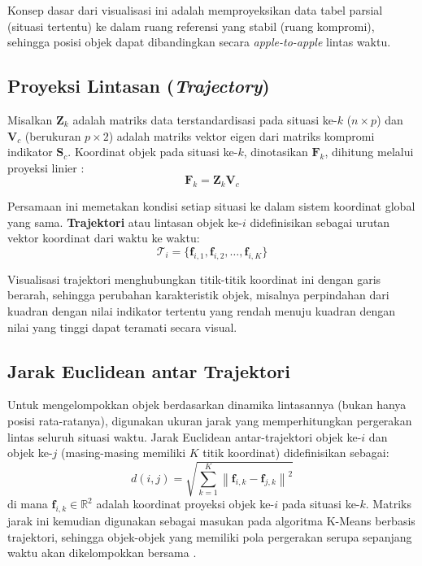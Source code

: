 Konsep dasar dari visualisasi ini adalah memproyeksikan data tabel parsial (situasi tertentu) ke dalam ruang referensi yang stabil (ruang kompromi), sehingga posisi objek dapat dibandingkan secara \textit{apple-to-apple} lintas waktu.

\subsection{\normalsize Proyeksi Lintasan (\textit{Trajectory})}

Misalkan $\mathbf{Z}_k$ adalah matriks data terstandardisasi pada situasi ke-$k$ ($n \times p$) dan $\mathbf{V}_c$ (berukuran $p \times 2$) adalah matriks vektor eigen dari matriks kompromi indikator $\mathbf{S}_c$. Koordinat objek pada situasi ke-$k$, dinotasikan $\mathbf{F}_k$, dihitung melalui proyeksi linier \citep{lavit94}:
\begin{equation}\label{eq:lintasan}
  \mathbf{F}_k = \mathbf{Z}_k \mathbf{V}_c
\end{equation}

Persamaan ini memetakan kondisi setiap situasi ke dalam sistem koordinat global yang sama. \textbf{Trajektori} atau lintasan objek ke-$i$ didefinisikan sebagai urutan vektor koordinat dari waktu ke waktu:
\begin{equation}
  \mathcal{T}_i = \{ \mathbf{f}_{i,1}, \mathbf{f}_{i,2}, \dots, \mathbf{f}_{i,K} \}
\end{equation}

Visualisasi trajektori menghubungkan titik-titik koordinat ini dengan garis berarah, sehingga perubahan karakteristik objek, misalnya perpindahan dari kuadran dengan nilai indikator tertentu yang rendah menuju kuadran dengan nilai yang tinggi dapat teramati secara visual.

\subsection{\normalsize Jarak Euclidean antar Trajektori}

Untuk mengelompokkan objek berdasarkan dinamika lintasannya (bukan hanya posisi rata-ratanya), digunakan ukuran jarak yang memperhitungkan pergerakan lintas seluruh situasi waktu. Jarak Euclidean antar-trajektori objek ke-$i$ dan objek ke-$j$ (masing-masing memiliki $K$ titik koordinat) didefinisikan sebagai:
\begin{equation}
  d(i, j) = \sqrt{\sum_{k=1}^{K} \left\| \mathbf{f}_{i,k} - \mathbf{f}_{j,k} \right\|^2}
\end{equation}
di mana $\mathbf{f}_{i,k} \in \mathbb{R}^2$ adalah koordinat proyeksi objek ke-$i$ pada situasi ke-$k$. Matriks jarak ini kemudian digunakan sebagai masukan pada algoritma K-Means berbasis trajektori, sehingga objek-objek yang memiliki pola pergerakan serupa sepanjang waktu akan dikelompokkan bersama \citep{egido2015}.

